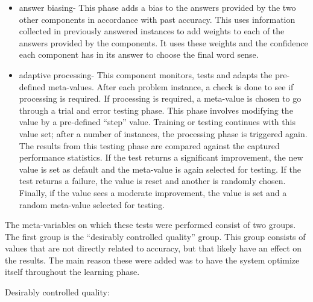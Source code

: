 \begin{itemize}
\item answer biasing- This phase adds a bias to the answers provided by the 
two other components in accordance with past accuracy.  This uses information 
collected in previously answered instances to add weights to each of the 
answers provided by the components. It uses these weights and the confidence 
each component has in its answer to choose the final word sense.      
\item adaptive processing- This component monitors, tests and adapts the 
pre-defined meta-values.  After each problem instance, a check is done to 
see if processing is required.  If processing is required, a meta-value is 
chosen to go through a trial and error testing phase.  This phase involves 
modifying the value by a pre-defined ``step'' value.  Training or testing 
continues with this value set; after a number of instances, the processing 
phase is triggered again. The results from this testing phase are compared 
against the captured performance statistics. If the test returns a significant 
improvement, the new value is set as 
default and the meta-value is again selected for testing. If the test 
returns a failure, the value is reset and another is randomly chosen. Finally, 
if the value sees a moderate improvement, the value is set and a random 
meta-value selected for testing.
\end{itemize}

The meta-variables on which these tests were performed consist of two groups. The
first group is the ``desirably controlled quality'' group.  This group
consists of values that are not directly related to accuracy, but that likely have an effect
on the results.  The main reason these were added was to have the system
optimize itself throughout the learning phase.

Desirably controlled quality:

